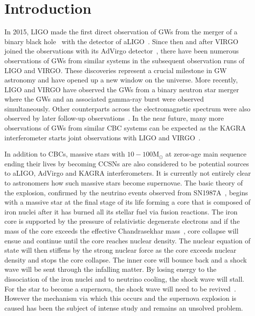 \documentclass[aps,twocolumn,showpacs,groupedaddress, nofootinbib]{revtex4}  %
\begin{document}
\section{Introduction}
%
%
In 2015, LIGO made the first direct observation of \acp{GW} from the
merger of a binary black hole~\cite{abbott2016observation} 
with the detector of \ac{aLIGO}~\cite{aasi2015advanced}.
Since then and after VIRGO joined the observations 
with its \ac{AdVirgo} detector~\cite{abbott2016gw151226,
abbott2017gw170608, abbott2017gw170814}, there have been
numerous observations of \acp{GW} from similar systems in the subsequent
observation runs of LIGO and VIRGO. These discoveries represent a crucial
milestone in \ac{GW} astronomy and have opened up a new window on the universe.
More recently, LIGO and VIRGO have observed the \acp{GW} from a binary neutron
star merger~\cite{abbott2017gw170817, abbott2017gravitational, abbott2017multi}
where the \acp{GW} and an associated gamma-ray burst were observed
simultaneously. Other counterparts across the electromagnetic spectrum were
also observed by later follow-up observations~\cite{abbott2017multi}. In the
near future, many more observations of \acp{GW} from similar \ac{CBC} systems
can be expected as the KAGRA interferometer starts joint observations with LIGO and
VIRGO~\cite{aso2013interferometer, somiya2012detector, abbott2018prospects, gossan2016observing,
abbott2016first, abbott2019optically}.

%
%
In addition to \acp{CBC}, massive stars with $10-100 \text{M}_\odot $ at
zeros-age main sequence ending their lives by becoming 
\acp{CCSN} are also considered to be potential sources to
\ac{aLIGO}, \ac{AdVirgo} and KAGRA interferometers. 
It is currently not entirely clear to astronomers how such
massive stars become supernovae. The basic theory of the explosion, confirmed
by the neutrino events observed from SN1987A~\cite{sato1987analysis}, begins
with a massive star at the final stage of its life forming a core that is
composed of iron nuclei after it has burned all its stellar fuel via fusion
reactions. The iron core is supported by the pressure of relativistic
degenerate electrons and if the mass of the core exceeds the effective
Chandrasekhar mass~\cite{baron1990effect, bethe1990supernova}, core collapse
will ensue and continue until the core reaches nuclear density. The nuclear
equation of state will then stiffens by the strong nuclear force as the core exceeds
nuclear density and stops the core collapse. The inner core will bounce back
and a shock wave will be sent through the infalling matter.  By losing energy
to the dissociation of the iron nuclei and to neutrino cooling, the shock wave
will stall. For the star to become a supernova, the shock wave will need to be
revived~\cite{o2011black}. However the mechanism via which this occurs and the
supernova explosion is caused has been the subject of intense study and remains
an unsolved problem.
\end{document}

